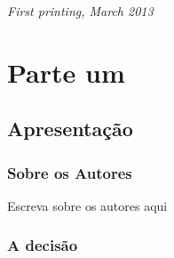\documentclass[11pt,fleqn]{book} %
\begin{document}
\noindent \textit{First printing, March 2013} %




\pagestyle{empty} %

\tableofcontents %

\cleardoublepage %

\pagestyle{fancy} %


\part{Parte um}



\chapter{Apresentação}

\section{Sobre os Autores}

Escreva sobre os autores aqui


\section{A decisão}
\end{document}
